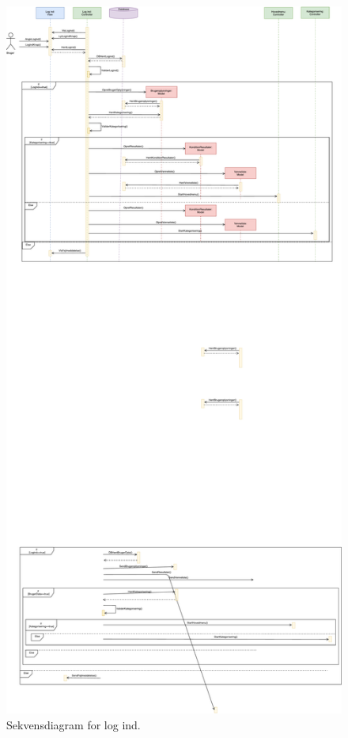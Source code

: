 \begin{figure} [H]
\centering
\includegraphics[width=1.1\textwidth]{figures/Sek/SEKLogInd}
\caption{Sekvensdiagram for log ind.}
\label{fig:SEKlogind}
\end{figure}

